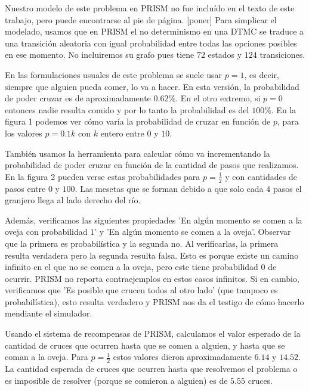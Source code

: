 \documentclass[runningheads]{llncs}
\begin{document}
Nuestro modelo de este problema en PRISM no fue incluído en el texto de este trabajo, pero puede encontrarse al pie de página. [poner] Para simplicar el modelado, usamos que en PRISM el no determinismo en una DTMC se traduce a una transición aleatoria con igual probabilidad entre todas las opciones posibles en ese momento. No incluiremos su grafo pues tiene $72$ estados y $124$ transiciones.

En las formulaciones usuales de este problema se suele usar $p=1$, es decir, siempre que alguien pueda comer, lo va a hacer. En esta versión, la probabilidad de poder cruzar es de aproximadamente $0.62\%$. En el otro extremo, si $p=0$ entonces nadie resulta comido y por lo tanto la probabilidad es del $100\%$. En la figura 1 podemos ver cómo varía la probabilidad de cruzar en función de $p$, para los valores $p=0.1k$ con $k$ entero entre $0$ y $10$. %

También usamos la herramienta para calcular cómo va incrementando la probabilidad de poder cruzar en función de la cantidad de pasos que realizamos. En la figura 2 pueden verse estas probabilidades para $p=\frac{1}{2}$ y con cantidades de pasos entre $0$ y $100$. Las mesetas que se forman debido a que solo cada $4$ pasos el granjero llega al lado derecho del río.

Además, verificamos las siguientes propiedades 'En algún momento se comen a la oveja con probabilidad $1$' y 'En algún momento se comen a la oveja'. Observar que la primera es probabilística y la segunda no. Al verificarlas, la primera resulta verdadera pero la segunda resulta falsa. Esto es porque existe un camino infinito en el que no se comen a la oveja, pero este tiene probabilidad $0$ de ocurrir. PRISM no reporta contraejemplos en estos casos infinitos. Si en cambio, verificamos que 'Es posible que crucen todos al otro lado' (que tampoco es probabilística), esto resulta verdadero y PRISM nos da el testigo de cómo hacerlo mendiante el simulador.

Usando el sistema de recompensas de PRISM, calculamos el valor esperado de la cantidad de cruces que ocurren hasta que se comen a alguien, y hasta que se coman a la oveja. Para $p=\frac{1}{2}$ estos valores dieron aproximadamente $6.14$ y $14.52$. La cantidad esperada de cruces que ocurren hasta que resolvemos el problema o es imposible de resolver (porque se comieron a alguien) es de $5.55$ cruces.
\end{document}
